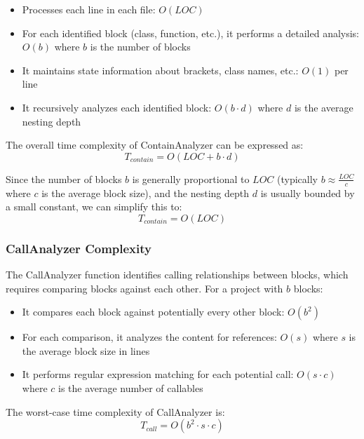 \begin{itemize}
    \item Processes each line in each file: $O(LOC)$
    \item For each identified block (class, function, etc.), it performs a detailed analysis: $O(b)$ where $b$ is the number of blocks
    \item It maintains state information about brackets, class names, etc.: $O(1)$ per line
    \item It recursively analyzes each identified block: $O(b \cdot d)$ where $d$ is the average nesting depth
\end{itemize}

The overall time complexity of ContainAnalyzer can be expressed as:
\begin{equation}
T_{contain} = O(LOC + b \cdot d)
\end{equation}

Since the number of blocks $b$ is generally proportional to $LOC$ (typically $b \approx \frac{LOC}{c}$ where $c$ is the average block size), and the nesting depth $d$ is usually bounded by a small constant, we can simplify this to:
\begin{equation}
T_{contain} = O(LOC)
\end{equation}

\subsubsection{CallAnalyzer Complexity}

The CallAnalyzer function identifies calling relationships between blocks, which requires comparing blocks against each other. For a project with $b$ blocks:

\begin{itemize}
    \item It compares each block against potentially every other block: $O(b^2)$
    \item For each comparison, it analyzes the content for references: $O(s)$ where $s$ is the average block size in lines
    \item It performs regular expression matching for each potential call: $O(s \cdot c)$ where $c$ is the average number of callables
\end{itemize}

The worst-case time complexity of CallAnalyzer is:
\begin{equation}
T_{call} = O(b^2 \cdot s \cdot c)
\end{equation}

